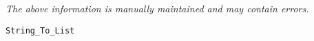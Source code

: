 \label{pkg:string\_to\_list}

{\tiny \it The above information is manually maintained and may contain errors.}
\begin{verbatim}
String_To_List
\end{verbatim}
